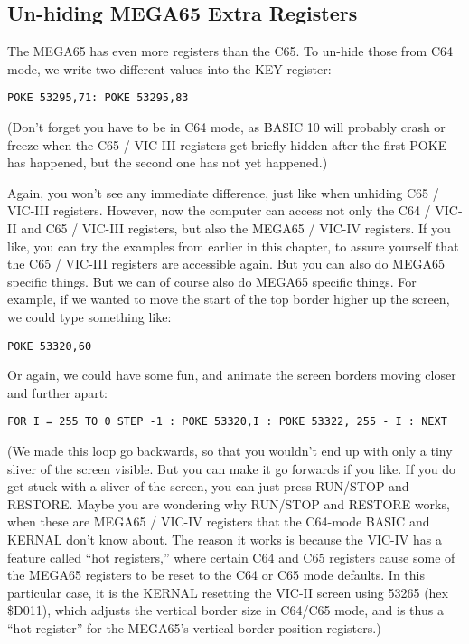 \subsection{Un-hiding MEGA65 Extra Registers}

The MEGA65 has even more registers than the C65.  To un-hide those from C64 mode, we write two different values into the KEY register:

\begin{tcolorbox}[colback=black,coltext=white]
\verbatimfont{\codefont}
\begin{verbatim}
POKE 53295,71: POKE 53295,83
\end{verbatim}
\end{tcolorbox}

(Don't forget you have to be in C64 mode, as BASIC 10 will probably crash or freeze when the C65 / VIC-III registers get briefly
hidden after the first POKE has happened, but the second one has not yet happened.)

Again, you won't see any immediate difference, just like when unhiding C65 / VIC-III registers.  However, now the computer
can access not only the C64 / VIC-II and C65 / VIC-III registers, but also the MEGA65 / VIC-IV registers.  If you like,
you can try the examples from earlier in this chapter, to assure yourself that the C65 / VIC-III registers are accessible again.
But you can also do MEGA65 specific things.  But we can of course also do MEGA65 specific things. For example, if we wanted to move
the start of the top border higher up the screen, we could type something like:

\begin{tcolorbox}[colback=black,coltext=white]
\verbatimfont{\codefont}
\begin{verbatim}
POKE 53320,60
\end{verbatim}
\end{tcolorbox}

Or again, we could have some fun, and animate the screen borders moving closer and further apart:

\begin{tcolorbox}[colback=black,coltext=white]
\verbatimfont{\codefont}
\begin{verbatim}
FOR I = 255 TO 0 STEP -1 : POKE 53320,I : POKE 53322, 255 - I : NEXT
\end{verbatim}
\end{tcolorbox}

(We made this loop go backwards, so that you wouldn't end up with only a tiny sliver of the
screen visible.  But you can make it go forwards if you like. If you do get stuck with a sliver
of the screen, you can just press RUN/STOP and RESTORE.  Maybe you are wondering why RUN/STOP
and RESTORE works, when these are MEGA65 / VIC-IV registers that the C64-mode BASIC and KERNAL
don't know about.  The reason it works is because the VIC-IV has a feature called ``hot registers,''
where certain C64 and C65 registers cause some of the MEGA65 registers to be reset to the C64 or
C65 mode defaults. In this particular case, it is the KERNAL resetting the VIC-II screen using
53265 (hex \$D011), which adjusts the vertical border size in C64/C65 mode, and is thus a ``hot register''
for the MEGA65's vertical border position registers.)

